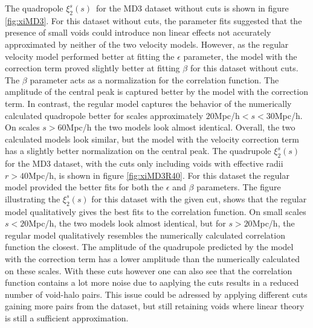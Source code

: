 The quadropole $\xi_2^s(s)$ for the MD3 dataset without cuts is shown in figure \ref{fig:xiMD3}. For this dataset without cuts, the parameter fits suggested that the presence of small voids could introduce non linear effects not accurately approximated by neither of the two velocity models. However, as the regular velocity model performed better at fitting the $\epsilon$ parameter, the model with the correction term proved slightly better at fitting $\beta$ for this dataset without cuts. The $\beta$ parameter acts as a normalization for the correlation function. The amplitude of the central peak is captured better by the model with the correction term. In contrast, the regular model captures the behavior of the numerically calculated quadropole better for scales approximately $20$Mpc/h$<s<30$Mpc/h. On scales $s>60$Mpc/h the two models look almost identical. Overall, the two calculated models look similar, but the model with the velocity correction term has a slightly better normalization on the central peak. The quadrupole $\xi_2^s(s)$ for the MD3 dataset, with the cuts only including voids with effective radii $r>40$Mpc/h, is shown in figure \ref{fig:xiMD3R40}. For this dataset the regular model provided the better fits for both the $\epsilon$ and $\beta$ parameters. The figure illustrating the $\xi_2^s(s)$ for this dataset with the given cut, shows that the regular model qualitatively gives the best fits to the correlation function. On small scales $s<20$Mpc/h, the two models look almost identical, but for $s>20$Mpc/h, the regular model qualitatively resembles the numerically calculated correlation function the closest. The amplitude of the quadrupole predicted by the model with the correction term has a lower amplitude than the numerically calculated on these scales. With these cuts however one can also see that the correlation function contains a lot more noise due to aaplying the cuts results in a reduced number of void-halo pairs. This issue could be adressed by applying different cuts gaining more pairs from the dataset, but still retaining voids where linear theory is still a sufficient approximation.\\\indent
